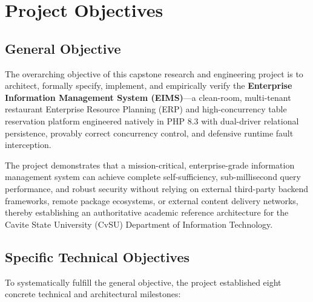 \chapter{Project Objectives}
\label{chap:project_objectives}

\section{General Objective}
\label{sec:obj_general}
The overarching objective of this capstone research and engineering project is to architect, formally specify, implement, and empirically verify the \textbf{Enterprise Information Management System (EIMS)}---a clean-room, multi-tenant restaurant Enterprise Resource Planning (ERP) and high-concurrency table reservation platform engineered natively in PHP 8.3 with dual-driver relational persistence, provably correct concurrency control, and defensive runtime fault interception.

The project demonstrates that a mission-critical, enterprise-grade information management system can achieve complete self-sufficiency, sub-millisecond query performance, and robust security without relying on external third-party backend frameworks, remote package ecosystems, or external content delivery networks, thereby establishing an authoritative academic reference architecture for the Cavite State University (CvSU) Department of Information Technology.

\section{Specific Technical Objectives}
\label{sec:obj_technical}
To systematically fulfill the general objective, the project established eight concrete technical and architectural milestones:

